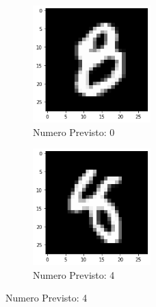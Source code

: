 \documentclass[12pt, a4paper]{article}
\begin{document}
\begin{figure}[H]
    \centering
    \begin{subfigure}{.5\textwidth}
        \centering
        \caption{Numero Previsto: 0}
        \includegraphics[width=0.50\textwidth]{otto1.png}
    \end{subfigure}%
    \begin{subfigure}{.5\textwidth}
        \centering
        \caption{Numero Previsto: 4}
        \includegraphics[width=0.50\textwidth]{otto2.png}
    \end{subfigure} 
\end{figure}
\end{document}
